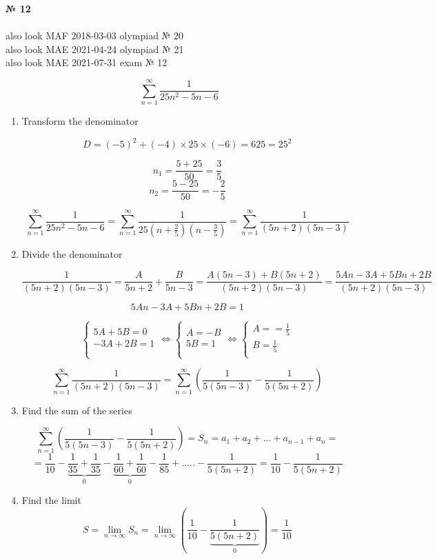 \documentclass{article}
\begin{document}
\textbf{№ 12} 
\\
\\ also look MAF 2018-03-03 olympiad № 20
\\ also look MAE 2021-04-24 olympiad № 21
\\ also look MAE 2021-07-31 exam № 12

$$\sum_{n=1}^{\infty} \frac{1}{25n^2-5n-6}$$

\begin{enumerate}

\item Transform the denominator

$$D = (-5)^2 + (-4)\times25\times(-6)=625=25^2$$

$$n_1 = \frac{5+25}{50}=\frac{3}{5}$$
$$n_2 = \frac{5-25}{50}=-\frac{2}{5}$$

$$\sum_{n=1}^{\infty} \frac{1}{25n^2-5n-6} = \sum_{n=1}^{\infty} \frac{1}{25(n+\frac{2}{5})(n-\frac{3}{5})} = \sum_{n=1}^{\infty} \frac{1}{(5n+2)(5n-3)}$$

\item Divide the denominator

$$\frac{1}{(5n+2)(5n-3)} = \frac{A}{5n+2} + \frac{B}{5n-3} 
= \frac{A(5n-3)+B(5n+2)}{(5n+2)(5n-3)} 
= \frac{5An-3A+5Bn+2B}{(5n+2)(5n-3)}$$

$$5An-3A+5Bn+2B = 1$$

$$
\left\{
  \begin{array}{ccc}
    5A + 5B = 0 \\
    -3A+2B = 1 \\
  \end{array}\Leftrightarrow
\left\{
  \begin{array}{ccc}
    A = -B \\
    5B = 1 \\
  \end{array}\Leftrightarrow
\left\{
  \begin{array}{ccc}
    A = =\frac{1}{5} \\
    B = \frac{1}{5} \\
  \end{array}
$$

$$ \sum_{n=1}^{\infty} \frac{1}{(5n+2)(5n-3)} = 
\sum_{n=1}^{\infty} \left(\frac{1}{5(5n-3)} - \frac{1}{5(5n+2)}\right) $$

\item Find the sum of the series

$$ \sum_{n=1}^{\infty} \left(\frac{1}{5(5n-3)} - \frac{1}{5(5n+2)}\right) 
= S_n = a_1+a_2+...+a_{n-1}+a_n = $$
$$ = \frac{1}{10} - \underbrace{\frac{1}{35} + \frac{1}{35}}_{0} - \underbrace{\frac{1}{60} + \frac{1}{60}}_{0} - \frac{1}{85} + ..... - \frac{1}{5(5n+2)} = \frac{1}{10} - \frac{1}{5(5n+2)}$$

\item Find the limit
$$S = \lim_{n\to\infty} S_n 
= \lim_{n\to\infty} \left(\frac{1}{10} - \underbrace{\frac{1}{5(5n+2)}}_{0}\right) 
= \frac{1}{10} $$


\end{enumerate}
\end{document}
